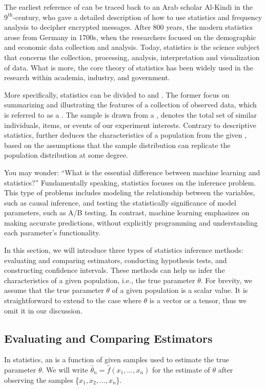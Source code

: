 \documentclass[letterpaper,11pt,english]{sphinxmanual}
\begin{document}
The earliest reference of  can be traced back to an Arab
scholar Al-Kindi in the \(9^{\mathrm{th}}\)-century, who gave a
detailed description of how to use statistics and frequency analysis to
decipher encrypted messages. After 800 years, the modern statistics
arose from Germany in 1700s, when the researchers focused on the
demographic and economic data collection and analysis. Today, statistics
is the science subject that concerns the collection, processing,
analysis, interpretation and visualization of data. What is more, the
core theory of statistics has been widely used in the research within
academia, industry, and government.

More specifically, statistics can be divided to 
and . The former focus on summarizing and
illustrating the features of a collection of observed data, which is
referred to as a . The sample is drawn from a ,
denotes the total set of similar individuals, items, or events of our
experiment interests. Contrary to descriptive statistics,  further deduces the characteristics of a population from the
given , based on the assumptions that the sample distribution
can replicate the population distribution at some degree.

You may wonder: “What is the essential difference between machine
learning and statistics?” Fundamentally speaking, statistics focuses on
the inference problem. This type of problems includes modeling the
relationship between the variables, such as causal inference, and
testing the statistically significance of model parameters, such as A/B
testing. In contrast, machine learning emphasizes on making accurate
predictions, without explicitly programming and understanding each
parameter’s functionality.

In this section, we will introduce three types of statistics inference
methods: evaluating and comparing estimators, conducting hypothesis
tests, and constructing confidence intervals. These methods can help us
infer the characteristics of a given population, i.e., the true
parameter \(\theta\). For brevity, we assume that the true parameter
\(\theta\) of a given population is a scalar value. It is
straightforward to extend to the case where \(\theta\) is a vector
or a tensor, thus we omit it in our discussion.


\subsection{Evaluating and Comparing Estimators}
\label{\detokenize{chapter_appendix_math/statistics:evaluating-and-comparing-estimators}}
In statistics, an  is a function of given samples used to
estimate the true parameter \(\theta\). We will write
\(\hat{\theta}_n = \hat{f}(x_1, \ldots, x_n)\) for the estimate of
\(\theta\) after observing the samples
\{\(x_1, x_2, \ldots, x_n\)\}.
\end{document}
